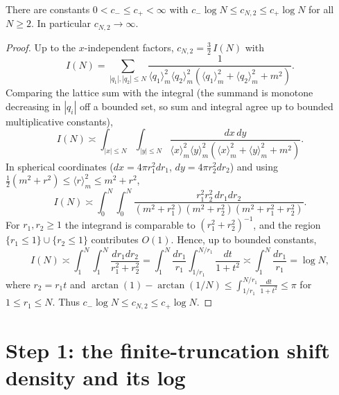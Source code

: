 \begin{qonelemma}\label{lem:logdiv}
There are constants $0<c_-\le c_+<\infty$ with $c_-\log N\le c_{N,2}\le c_+\log N$ for
all $N\ge2$. In particular $c_{N,2}\to\infty$.
\end{qonelemma}
\begin{proof}
Up to the $x$-independent factors, $c_{N,2}=\tfrac32\,I(N)$ with
\[
I(N)=\sum_{|q_1|,|q_2|\le N}\frac{1}{\langle q_1\rangle_m^2\langle q_2\rangle_m^2(\langle q_1\rangle_m^2+\langle q_2\rangle_m^2+m^2)} .
\]
Comparing the lattice sum with the integral (the summand is monotone decreasing in
$|q_i|$ off a bounded set, so sum and integral agree up to bounded multiplicative
constants),
\[
I(N)\asymp\int_{|x|\le N}\!\!\int_{|y|\le N}\frac{dx\,dy}{\langle x\rangle_m^2\langle y\rangle_m^2(\langle x\rangle_m^2+\langle y\rangle_m^2+m^2)} .
\]
In spherical coordinates ($dx=4\pi r_1^2dr_1$, $dy=4\pi r_2^2dr_2$) and using
$\tfrac12(m^2+r^2)\le\langle r\rangle_m^2\le m^2+r^2$,
\[
I(N)\asymp\int_0^N\!\!\int_0^N\frac{r_1^2r_2^2\,dr_1dr_2}{(m^2+r_1^2)(m^2+r_2^2)(m^2+r_1^2+r_2^2)} .
\]
For $r_1,r_2\ge1$ the integrand is comparable to $(r_1^2+r_2^2)^{-1}$, and the region
$\{r_1\le1\}\cup\{r_2\le1\}$ contributes $O(1)$. Hence, up to bounded constants,
\[
I(N)\asymp\int_1^N\!\!\int_1^N\frac{dr_1dr_2}{r_1^2+r_2^2}
=\int_1^N\frac{dr_1}{r_1}\int_{1/r_1}^{N/r_1}\frac{dt}{1+t^2}\asymp\int_1^N\frac{dr_1}{r_1}=\log N,
\]
where $r_2=r_1t$ and $\arctan(1)-\arctan(1/N)\le\int_{1/r_1}^{N/r_1}\frac{dt}{1+t^2}\le\pi$
for $1\le r_1\le N$. Thus $c_-\log N\le c_{N,2}\le c_+\log N$.
\end{proof}

\section*{Step 1: the finite-truncation shift density and its log}

